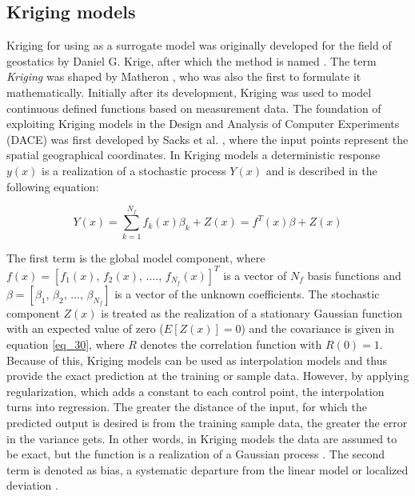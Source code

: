 
\subsection{Kriging models}
\label{subsec_Kriging_Surrogate}
Kriging for using as a surrogate model was originally developed 
for the field of geostatics by Daniel G. Krige, after which the 
method is named \cite{krige_statistical_1951}. The 
term \emph{Kriging} was shaped by Matheron \cite{matheron_principles_1963}, 
who was also the first to formulate it mathematically. Initially after 
its development, Kriging was used to model continuous 
defined functions based on measurement data. The foundation 
of exploiting Kriging models in the Design and Analysis of 
Computer Experiments (DACE) was first developed by 
Sacks et al. \cite{sacks_design_1989}, where 
the input points represent the spatial 
geographical coordinates. In Kriging models a 
deterministic response $y(x)$ is a realization of a stochastic
process $Y(x)$ \cite{sacks_design_1989} and is described in 
the following equation: 

\begin{equation}
    \label{eq_29}
    Y(x) = \sum_{k=1}^{N_f}f_k(x) \beta_k + Z(x) = f^T (x) \beta + Z(x)
\end{equation}

The first term is the global model component, where
$f(x) = [f_1(x), \, f_2(x),\, ....,\,
f_{N_f}(x)]^T$ 
is a vector of $N_f$ 
basis functions and $\beta = [\beta_1, \,\beta_2,\, ..., \,\beta_{N_f}]$
is a vector of the
unknown coefficients. The stochastic component $Z(x)$ is 
treated as the realization of a stationary Gaussian 
function with an expected value of zero ($E[Z(x)]=0$) 
and the covariance is given in equation \eqref{eq_30}, where 
$R$ denotes the correlation function with $R(0) = 1$.
Because of this, Kriging models can be used
as interpolation models 
and thus provide the exact prediction at the 
training or sample data. However, by applying 
regularization, which adds a constant to each 
control point, the interpolation turns into 
regression. The greater the distance 
of the input, for which the predicted 
output is desired is from the training sample data, 
the greater the error in the variance gets.
In other words, in Kriging models the data are assumed 
to be exact, but the function is a realization of a
Gaussian process \cite{viana_special_2014}. The second term 
is denoted as bias, a systematic departure from the linear model 
or localized deviation \cite{simpson_kriging_2001}.

